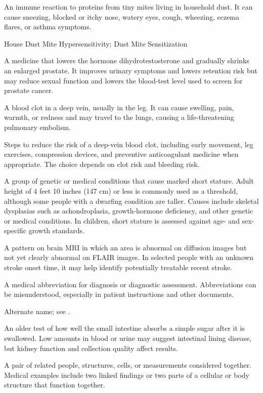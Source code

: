  An immune reaction to proteins from tiny mites living in household dust. It can cause sneezing, blocked or itchy nose, watery eyes, cough, wheezing, eczema flares, or asthma symptoms.

\synonyms
House Dust Mite Hypersensitivity; Dust Mite Sensitization

 A medicine that lowers the hormone dihydrotestosterone and gradually shrinks an enlarged prostate. It improves urinary symptoms and lowers retention risk but may reduce sexual function and lowers the blood-test level used to screen for prostate cancer.

 A blood clot in a deep vein, usually in the leg. It can cause swelling, pain, warmth, or redness and may travel to the lungs, causing a life-threatening pulmonary embolism.

 Steps to reduce the risk of a deep-vein blood clot, including early movement, leg exercises, compression devices, and preventive anticoagulant medicine when appropriate. The choice depends on clot risk and bleeding risk.

 A group of genetic or medical conditions that cause marked short stature. Adult height of 4 feet 10 inches (147 cm) or less is commonly used as a threshold, although some people with a dwarfing condition are taller. Causes include skeletal dysplasias such as achondroplasia, growth-hormone deficiency, and other genetic or medical conditions. In children, short stature is assessed against age- and sex-specific growth standards.

 A pattern on brain MRI in which an area is abnormal on diffusion images but not yet clearly abnormal on FLAIR images. In selected people with an unknown stroke onset time, it may help identify potentially treatable recent stroke.

 A medical abbreviation for diagnosis or diagnostic assessment. Abbreviations can be misunderstood, especially in patient instructions and other documents.

 Alternate name; see .

 An older test of how well the small intestine absorbs a simple sugar after it is swallowed. Low amounts in blood or urine may suggest intestinal lining disease, but kidney function and collection quality affect results.

 A pair of related people, structures, cells, or measurements considered together. Medical examples include two linked findings or two parts of a cellular or body structure that function together.

